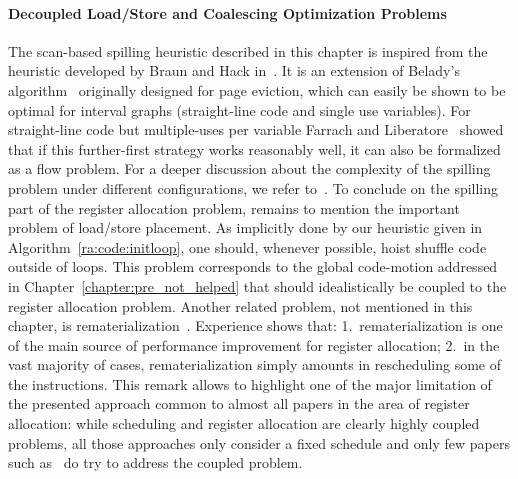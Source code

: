 {\paragraph{Decoupled Load/Store and Coalescing Optimization Problems}
The scan-based spilling heuristic described in this chapter is inspired from the heuristic developed by Braun and Hack in~\cite{Braun:2009:CC}.
It is an extension of Belady's algorithm~\cite{belady:1966:storage} originally designed for page eviction, which can easily be shown to be optimal for interval graphs (straight-line code and single use variables).
For straight-line code but multiple-uses per variable Farrach and Liberatore~\cite{farach:98:local} showed that if this further-first strategy works reasonably well, it can also be formalized as a flow problem.
For a deeper discussion about the complexity of the spilling problem under different configurations, we refer to~\cite{Bouchez07b}.
To conclude on the spilling part of the register allocation problem, remains to mention the important problem of load/store placement.
As implicitly done by our heuristic given in Algorithm~\ref{ra:code:initloop}, one should, whenever possible, hoist shuffle code outside of loops.
This problem corresponds to the global code-motion addressed in Chapter~\ref{chapter:pre_not_helped} that should idealistically be coupled to the register allocation problem.
Another related problem, not mentioned in this chapter, is rematerialization~\cite{rematerialization}.
Experience shows that:
1.~rematerialization is one of the main source of performance improvement for register allocation;
2.~in the vast majority of cases, rematerialization simply amounts in rescheduling some of the instructions.
This remark allows to highlight one of the major limitation of the presented approach common to almost all papers in the area of register allocation:
while scheduling and register allocation are clearly highly coupled problems, all those approaches only consider a fixed schedule and only few papers such as~\cite{norris1993scheduler,Pinter:1993:RAI,Wang:1994:SPR,Motwani:1995:CRA,Berson:1998:IIS,Codina:2001:UMS,touati,Rawat:2018:ROS} do try to address the coupled problem.

}
